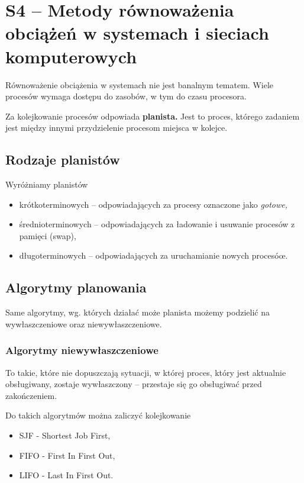 \section{S4 -- Metody równoważenia obciążeń w systemach i sieciach komputerowych}

Równoważenie obciążenia w systemach nie jest banalnym tematem.
Wiele procesów wymaga dostępu do zasobów, w tym do czasu procesora.

Za kolejkowanie procesów odpowiada \textbf{planista.}
Jest to proces, którego zadaniem jest między innymi przydzielenie procesom miejsca w kolejce.

\subsection{Rodzaje planistów}
Wyróżniamy planistów
\begin{itemize}
	\item{krótkoterminowych -- odpowiadających za procesy oznaczone jako \textit{gotowe,}}
	\item{średnioterminowych -- odpowiadających za ładowanie i usuwanie procesów z pamięci (swap),}
	\item{długoterminowych -- odpowiadających za uruchamianie nowych procesóœ.}
\end{itemize}

\subsection{Algorytmy planowania}
Same algorytmy, wg. których działać może planista możemy podzielić na wywłaszczeniowe oraz niewywłaszczeniowe.

\subsubsection{Algorytmy niewywłaszczeniowe}
To takie, które nie dopuszczają sytuacji, w której proces, który jest aktualnie obsługiwany, zostaje wywłaszczony -- przestaje się go obsługiwać przed zakończeniem.

Do takich algorytmów można zaliczyć kolejkowanie
\begin{itemize}
	\item{SJF - Shortest Job First,}
	\item{FIFO - First In First Out,}
	\item{LIFO - Last In First Out.}
\end{itemize}

